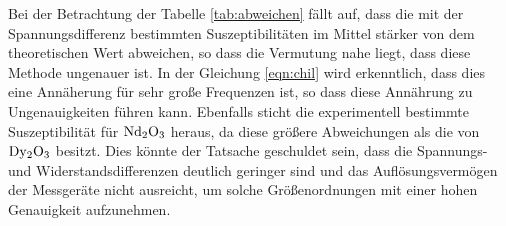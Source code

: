 Bei der Betrachtung der Tabelle \ref{tab:abweichen} fällt auf, dass die mit der Spannungsdifferenz bestimmten Suszeptibilitäten im Mittel stärker von dem 
theoretischen Wert abweichen, so dass die Vermutung nahe liegt, dass diese Methode ungenauer ist. 
In der Gleichung \eqref{eqn:chil} wird erkenntlich, dass dies  eine Annäherung für sehr große Frequenzen ist, so dass diese Annährung zu Ungenauigkeiten 
führen kann.
Ebenfalls sticht die experimentell bestimmte Suszeptibilität für $\ce{Nd2O3}$ heraus, da diese größere Abweichungen als die von $\ce{Dy2O3}$
besitzt.
Dies könnte der Tatsache geschuldet sein, dass die Spannungs- und Widerstandsdifferenzen deutlich geringer sind und das Auflösungsvermögen der Messgeräte 
nicht ausreicht, um solche Größenordnungen mit einer hohen Genauigkeit aufzunehmen.